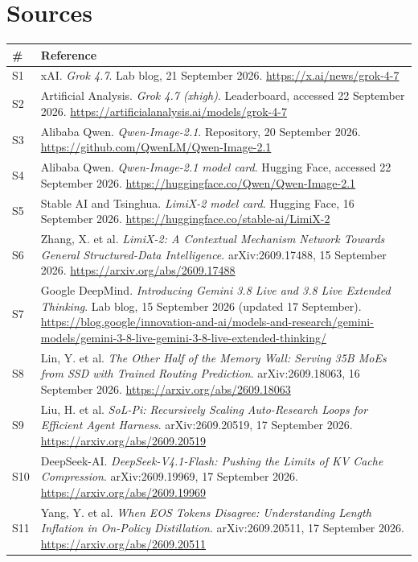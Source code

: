 \documentclass[11pt,a4paper]{article}
\begin{document}
\section{Sources}
{\footnotesize
\begin{tabularx}{\textwidth}{@{}l X@{}}
\toprule
\textbf{\#} & \textbf{Reference} \\
\midrule
S1 & xAI. \emph{Grok 4.7}. Lab blog, 21 September 2026. \url{https://x.ai/news/grok-4-7} \\
S2 & Artificial Analysis. \emph{Grok 4.7 (xhigh)}. Leaderboard, accessed 22 September 2026. \url{https://artificialanalysis.ai/models/grok-4-7} \\
S3 & Alibaba Qwen. \emph{Qwen-Image-2.1}. Repository, 20 September 2026. \url{https://github.com/QwenLM/Qwen-Image-2.1} \\
S4 & Alibaba Qwen. \emph{Qwen-Image-2.1 model card}. Hugging Face, accessed 22 September 2026. \url{https://huggingface.co/Qwen/Qwen-Image-2.1} \\
S5 & Stable AI and Tsinghua. \emph{LimiX-2 model card}. Hugging Face, 16 September 2026. \url{https://huggingface.co/stable-ai/LimiX-2} \\
S6 & Zhang, X. et al. \emph{LimiX-2: A Contextual Mechanism Network Towards General Structured-Data Intelligence}. arXiv:2609.17488, 15 September 2026. \url{https://arxiv.org/abs/2609.17488} \\
S7 & Google DeepMind. \emph{Introducing Gemini 3.8 Live and 3.8 Live Extended Thinking}. Lab blog, 15 September 2026 (updated 17 September). \url{https://blog.google/innovation-and-ai/models-and-research/gemini-models/gemini-3-8-live-gemini-3-8-live-extended-thinking/} \\
S8 & Lin, Y. et al. \emph{The Other Half of the Memory Wall: Serving 35B MoEs from SSD with Trained Routing Prediction}. arXiv:2609.18063, 16 September 2026. \url{https://arxiv.org/abs/2609.18063} \\
S9 & Liu, H. et al. \emph{SoL-Pi: Recursively Scaling Auto-Research Loops for Efficient Agent Harness}. arXiv:2609.20519, 17 September 2026. \url{https://arxiv.org/abs/2609.20519} \\
S10 & DeepSeek-AI. \emph{DeepSeek-V4.1-Flash: Pushing the Limits of KV Cache Compression}. arXiv:2609.19969, 17 September 2026. \url{https://arxiv.org/abs/2609.19969} \\
S11 & Yang, Y. et al. \emph{When EOS Tokens Disagree: Understanding Length Inflation in On-Policy Distillation}. arXiv:2609.20511, 17 September 2026. \url{https://arxiv.org/abs/2609.20511} \\

\end{tabularx}}
\end{document}
